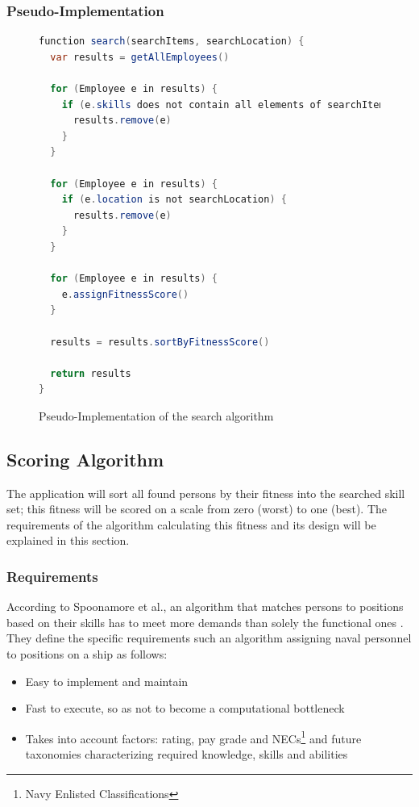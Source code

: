 \newpage
\subsubsection{Pseudo-Implementation}
\begin{figure}[h]
\begin{lstlisting}[language=Java]
function search(searchItems, searchLocation) {
  var results = getAllEmployees()

  for (Employee e in results) {
    if (e.skills does not contain all elements of searchItems) {
      results.remove(e)
    }
  }

  for (Employee e in results) {
    if (e.location is not searchLocation) {
      results.remove(e)
    }
  }

  for (Employee e in results) {
    e.assignFitnessScore()
  }

  results = results.sortByFitnessScore()

  return results
}
\end{lstlisting}
\caption[Pseudocode: Search Algorithm]{Pseudo-Implementation of the search algorithm}
\end{figure}

\subsection{Scoring Algorithm}
\label{fitscorealg}
The application will sort all found persons by their fitness into the searched skill set; this fitness will be scored on a scale from zero (worst) to one (best).
The requirements of the algorithm calculating this fitness and its design will be explained in this section.

\subsubsection{Requirements}
According to Spoonamore et al., an algorithm that matches persons to positions based on their skills has to meet more demands than solely the functional ones \cite[P. 14]{USN}. They define the specific requirements such an algorithm assigning naval personnel to positions on a ship as follows:
\begin{itemize}
  \item Easy to implement and maintain
  \item Fast to execute, so as not to become a computational bottleneck
  \item Takes into account factors: rating, pay grade and NECs\footnote{Navy Enlisted Classifications} and future taxonomies characterizing required knowledge, skills and abilities
\end{itemize}

